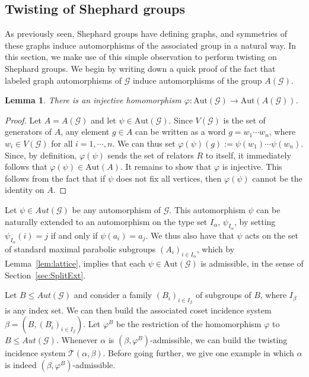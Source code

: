 \documentclass[11pt,letterpaper]{amsart}
\newtheorem{lemma}[prop]{Lemma}
\newcommand{\GG}{\mathcal{G}}
\newcommand{\TT}{\mathcal{T}}
\newcommand{\Aut}{\mathrm{Aut}}
\begin{document}
\subsection{Twisting of Shephard groups}\label{sec:twist_shephard_groups}

As previously seen, Shephard groups have defining graphs, and symmetries of these graphs induce automorphisms of the associated group in a natural way. In this section, we make use of this simple observation to perform twisting on Shephard groups.
We begin by writing down a quick proof of the fact that labeled graph automorphisms of $\GG$ induce automorphisms of the group $A(\GG)$.

\begin{lemma}\label{lem:varphiGraphAutToGroupAut}
    There is an injective homomorphism $\varphi \colon \Aut(\GG) \to \Aut(A(\GG))$.
\end{lemma}

\begin{proof}
   Let $A = A(\GG)$ and let $\psi \in \Aut(\GG)$. Since $V(\GG)$ is the set of generators of $A$, any element $g \in A$ can be written as a word $g = w_1 \cdots w_n$, where $w_i \in V(\GG)$ for all $i = 1, \cdots, n$. We can thus set $\varphi(\psi)(g) := \psi(w_1) \cdots \psi(w_n)$. Since, by definition, $\varphi(\psi)$ sends the set of relators $R$ to itself, it immediately follows that $\varphi(\psi) \in \Aut(A)$. It remains to show that $\varphi$ is injective. This follows from the fact that if $\psi$ does not fix all vertices, then $\varphi(\psi)$ cannot be the identity on $A$.
\end{proof}



Let $\psi\in Aut(\GG)$ be any automorphism of $\GG$. This automorphism $\psi$ can be naturally extended to an automorphism on the type set $I_\alpha$, $\psi_{I_\alpha}$, by setting $\psi_{I_\alpha}(i) = j$ if and only if $\psi(a_i) = a_j$. We thus also have that $\psi$ acts on the set of standard maximal parabolic subgroups $(A_i)_{i \in I_\alpha}$,  which by Lemma~\ref{lem:lattice}, implies that each $\psi\in \Aut(\GG)$ is admissible, in the sense of Section~\ref{sec:SplitExt}.

Let $B\leq Aut(\GG)$ and consider a family $(B_i)_{i\in I_\beta}$ of subgroups of $B$, where $I_\beta$ is any index set.
We can then build the associated coset incidence system $\beta=(B,(B_i)_{i\in I_\beta})$.
Let $\varphi^B$ be the restriction of the homomorphism $\varphi$ to $B\leq Aut(\GG)$.
Whenever $\alpha$ is $(\beta,\varphi^B)$-admissible, we can build the twisting incidence system $\TT(\alpha,\beta)$. Before going further, we give one example in which $\alpha$ is indeed $(\beta,\varphi^B)$-admissible.
\end{document}
